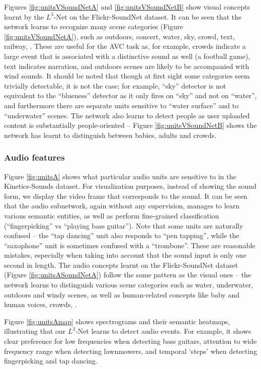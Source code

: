 \documentclass[10pt,twocolumn,letterpaper]{article}
\begin{document}
Figures \ref{fig:unitsVSoundNetA} and \ref{fig:unitsVSoundNetB} show
visual concepts learnt by the $L^3$-Net on the Flickr-SoundNet dataset.
It can be seen that the network learns to recognize many scene categories
(Figure \ref{fig:unitsVSoundNetA}),
such as outdoors, concert, water, sky, crowd, text, railway, \etc.
These are useful for the AVC task as, for example, crowds indicate a large
event that is associated with a distinctive sound as well
(\eg a football game), text indicates narration, and outdoors scenes are
likely to be accompanied with wind sounds.
It should be noted that though at first sight some categories seem trivially
detectable, it is not the case; for example, ``sky'' detector is not equivalent to
the ``blueness'' detector as it only fires on ``sky'' and not on ``water'',
and furthermore there are separate units sensitive to ``water surface''
and to ``underwater'' scenes.
The network also learns to detect people as user uploaded content is
substantially people-oriented -- Figure \ref{fig:unitsVSoundNetB} shows
the network has learnt to distinguish between babies, adults and crowds.

\figUnitsVSoundNetA


\subsubsection{Audio features}
Figure \ref{fig:unitsA} shows what particular audio units
are sensitive to in the Kinetics-Sounds dataset.
For visualization purposes, instead of showing
the sound form, we display the video frame that corresponds to the sound.
It can be seen that the audio subnetwork, again without any supervision,
manages to learn various semantic entities, as well as perform fine-grained
classification (``fingerpicking'' vs ``playing bass guitar'').
Note that some units are naturally confused -- the ``tap dancing'' unit also
responds to ``pen tapping'', while the ``saxophone'' unit is sometimes
confused with a ``trombone''. These are reasonable mistakes, especially
when taking into account that the sound input is only one second in length.
The audio concepts learnt on the Flickr-SoundNet dataset (Figure \ref{fig:unitsASoundNetA}) follow
the same pattern as the visual ones -- the network learns to distinguish
various scene categories such as water, underwater, outdoors and windy scenes,
as well as human-related concepts like baby and human voices, crowds, \etc.

Figure \ref{fig:unitsAmap} shows spectrograms and their semantic heatmaps,
illustrating that our $L^3$-Net learns to detect audio events.
For example, it shows clear preference for low frequencies when detecting
bass guitars, attention to wide frequency range when detecting lawnmowers,
and temporal `steps' when detecting fingerpicking and tap dancing.
\end{document}

